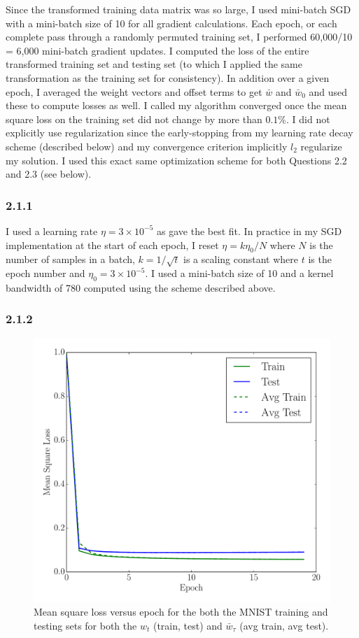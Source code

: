 \documentclass[12pt]{amsart}
\begin{document}
Since the transformed training data matrix was so large, I used mini-batch SGD with a mini-batch size of 10 for all gradient calculations.  Each epoch, or each complete pass through a randomly permuted training set, I performed 60,000/10 = 6,000 mini-batch gradient updates.  I computed the loss of the entire transformed training set and testing set (to which I applied the same transformation as the training set for consistency).  In addition over a given epoch, I averaged the weight vectors and offset terms to get $\bar{w}$ and $\bar{w}_0$ and used these to compute losses as well.  I called my algorithm converged once the mean square loss on the training set did not change by more than $0.1\%$.  I did not explicitly use regularization since the early-stopping from my learning rate decay scheme (described below) and my convergence criterion implicitly $l_2$ regularize my solution.  I used this exact same optimization scheme for both Questions 2.2 and 2.3 (see below).

\subsubsection*{2.1.1}

I used a learning rate $\eta = 3 \times 10^{-5}$ as gave the best fit.  In practice in my SGD implementation at the start of each epoch, I reset $\eta = k\eta_0/N$ where $N$ is the number of samples in a batch, $k = 1/\sqrt{t}$ is a scaling constant where $t$ is the epoch number and $\eta_0 = 3 \times 10^{-5}$.  I used a mini-batch size of 10 and a kernel bandwidth of 780 computed using the scheme described above.

\subsubsection*{2.1.2}
\begin{figure}[H]
	\includegraphics[width=\columnwidth]{pca_square_loss.pdf}
    \caption{Mean square loss versus epoch for the both the MNIST training and testing sets for both the $w_t$ (train, test) and $\bar{w}_{\tau}$ (avg train, avg test).}
    \label{fig:pca_square_loss}
\end{figure}
\end{document}
